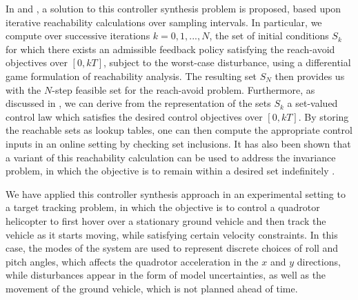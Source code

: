                In \cite{c:ding-CDC-2010} and \cite{c:ding-ICRA-2011},
               a solution to this controller synthesis problem is
               proposed, based upon iterative reachability
               calculations over sampling intervals.  In particular,
               we compute over successive iterations $k = 0,1,...,N$,
               the set of initial conditions $S_k$ for which there
               exists an admissible feedback policy satisfying the
               reach-avoid objectives over $[0,kT]$, subject to the
               worst-case disturbance, using a differential game
               formulation of reachability analysis.  The resulting
               set $S_N$ then provides us with the $N$-step feasible
               set for the reach-avoid problem.  Furthermore, as
               discussed in \cite{c:ding-CDC-2010}, we can derive from
               the representation of the sets $S_k$ a set-valued
               control law which satisfies the desired control
               objectives over $[0,kT]$.  By storing the reachable
               sets as lookup tables, one can then compute the
               appropriate control inputs in an online setting by
               checking set inclusions.  It has also been shown that a
               variant of this reachability calculation can be used to
               address the invariance problem, in which the objective
               is to remain within a desired set indefinitely
               \cite{c:ding-ICRA-2011}.

               We have applied this controller synthesis approach in
               an experimental setting to a target tracking problem,
               in which the objective is to control a quadrotor
               helicopter to first hover over a stationary ground
               vehicle and then track the vehicle as it starts moving,
               while satisfying certain velocity constraints.  In this
               case, the modes of the system are used to represent
               discrete choices of roll and pitch angles, which
               affects the quadrotor acceleration in the $x$ and $y$
               directions, while disturbances appear in the form of
               model uncertainties, as well as the movement of the
               ground vehicle, which is not planned ahead of time.

